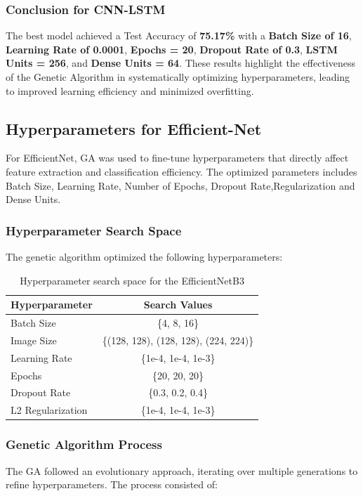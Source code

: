 \subsubsection{Conclusion for CNN-LSTM}
The best model achieved a Test Accuracy of \textbf{75.17\%} with a \textbf{Batch Size of 16}, \textbf{Learning Rate of 0.0001}, \textbf{Epochs = 20}, \textbf{Dropout Rate of 0.3}, \textbf{LSTM Units = 256}, and \textbf{Dense Units = 64}. These results highlight the effectiveness of the Genetic Algorithm in systematically optimizing hyperparameters, leading to improved learning efficiency and minimized overfitting.


\subsection{Hyperparameters for Efficient-Net}
For EfficientNet, GA was used to fine-tune hyperparameters that directly affect feature extraction and classification efficiency. The optimized parameters includes Batch Size, Learning Rate, Number of Epochs, Dropout Rate,Regularization and Dense Units.

\subsubsection{Hyperparameter Search Space}
The genetic algorithm optimized the following hyperparameters:
\begin{table}[h]
      \centering
      \begin{tabular}{|l|c|}
          \hline
          \textbf{Hyperparameter} & \textbf{Search Values} \\
          \hline
          Batch Size & \{4, 8, 16\} \\
          Image Size & \{(128, 128), (128, 128), (224, 224)\} \\
          Learning Rate & \{1e-4, 1e-4, 1e-3\} \\
          Epochs & \{20, 20, 20\} \\
          Dropout Rate & \{0.3, 0.2, 0.4\} \\
          L2 Regularization & \{1e-4, 1e-4, 1e-3\} \\
          \hline
      \end{tabular}
      \caption{Hyperparameter search space for the EfficientNetB3}
      \label{tab:search_space}
  \end{table}
  
\subsubsection{Genetic Algorithm Process}
The GA followed an evolutionary approach, iterating over multiple generations to refine hyperparameters. The process consisted of:

